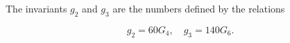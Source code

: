 The invariants $g_2$ and $g_3$ are the numbers defined by the relations

$$g_2 = 60 G_4, \quad g_3 = 140 G_6.$$
